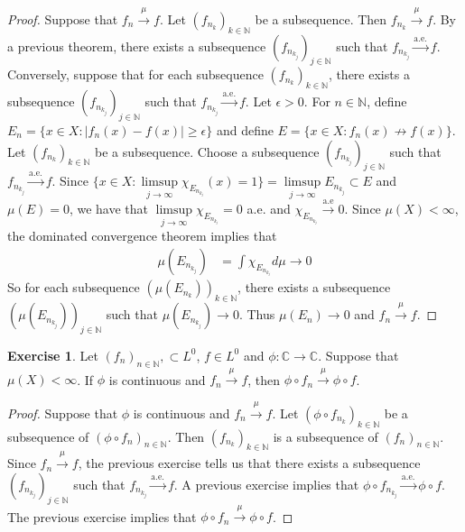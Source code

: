 \documentclass[12pt]{amsart}
\theoremstyle{definition}
\newtheorem{ex}[definition]{Exercise}
\newcommand{\ep}{\epsilon}
\newcommand{\C}{\mathbb{C}}
\newcommand{\N}{\mathbb{N}}
\newcommand{\convt}[1]{\xrightarrow{\text{#1}}}
\newcommand{\conv}[1]{\xrightarrow{#1}}
\newcommand{\lex}[1]{\label{ex:#1}}
\begin{document}
	\begin{proof}
		Suppose that $f_n \conv{\mu} f$. Let $(f_{n_k})_{k \in \N}$ be a subsequence. Then $f_{n_k} \conv{\mu} f$. By a previous theorem, there exists a subsequence $(f_{n_{k_j}})_{j \in \N}$ such that $f_{n_{k_j}} \convt{a.e.} f$. Conversely, suppose that for each subsequence $(f_{n_k})_{k \in \N}$, there exists a subsequence $(f_{n_{k_j}})_{j \in \N}$ such that $f_{n_{k_j}} \convt{a.e.} f$. Let $\ep >0$. For $n \in \N$, define $E_{n} = \{x \in X: |f_n(x) - f(x) | \geq \ep\}$ and define $E = \{x \in X: f_n(x) \not \rightarrow f(x)\}$. Let $(f_{n_k})_{k \in \N}$ be a subsequence. Choose a subsequence $(f_{n_{k_j}})_{j \in \N}$ such that $f_{n_{k_j}} \convt{a.e.} f$. Since $\bigg \{x \in X: \limsup\limits_{j \rightarrow \infty} \chi_{E_{n_{k_j}}}(x) = 1\bigg \} = \limsup\limits_{j \rightarrow \infty} E_{n_{k_j}} \subset E$ and $\mu(E) = 0$, we have that $\limsup\limits_{j \rightarrow \infty} \chi_{E_{n_{k_j}}} = 0$ a.e. and $\chi_{E_{n_{k_j}}} \convt{a.e} 0$. Since $\mu(X) < \infty$, the dominated convergence theorem implies that 
		\begin{align*}
			\mu(E_{n_{k_j}}) 
			&= \int \chi_{E_{n_{k_j}}} d \mu  \rightarrow 0
		\end{align*} 
		So for each subsequence $(\mu(E_{n_k}))_{k \in \N}$, there exists a subsequence $(\mu(E_{n_{k_j}}))_{j \in \N}$ such that $\mu(E_{n_{k_j}}) \rightarrow 0$. Thus $\mu(E_n) \rightarrow 0$ and $f_n \conv{\mu} f$.
	\end{proof}
	
	\begin{ex} \lex{35014} 
		Let $(f_n)_{n \in \N}, \subset L^0$, $f \in L^0$ and $\phi: \C \rightarrow \C$. Suppose that $\mu(X) < \infty$. If $\phi$ is continuous and $f_n \conv{\mu} f$, then $\phi \circ f_n \conv{\mu} \phi \circ f$.
	\end{ex}
	
	\begin{proof}
		Suppose that $\phi$ is continuous and $f_n \conv{\mu} f$. Let $(\phi \circ f_{n_k})_{k \in \N}$ be a subsequence of $(\phi \circ f_{n})_{n \in \N}$. Then $(f_{n_k})_{k \in \N}$ is a subsequence of $(f_{n})_{n \in \N}$. Since $f_n \conv{\mu} f$, the previous exercise tells us that there exists a subsequence $(f_{n_{k_j}})_{j \in \N}$ such that $f_{n_{k_j}} \convt{a.e.} f$. A previous exercise implies that $\phi \circ f_{n_{k_j}}\convt{a.e.} \phi \circ f$. The previous exercise implies that $\phi \circ f_{n}\conv{\mu} \phi \circ f$.
	\end{proof}
	
\end{document}
